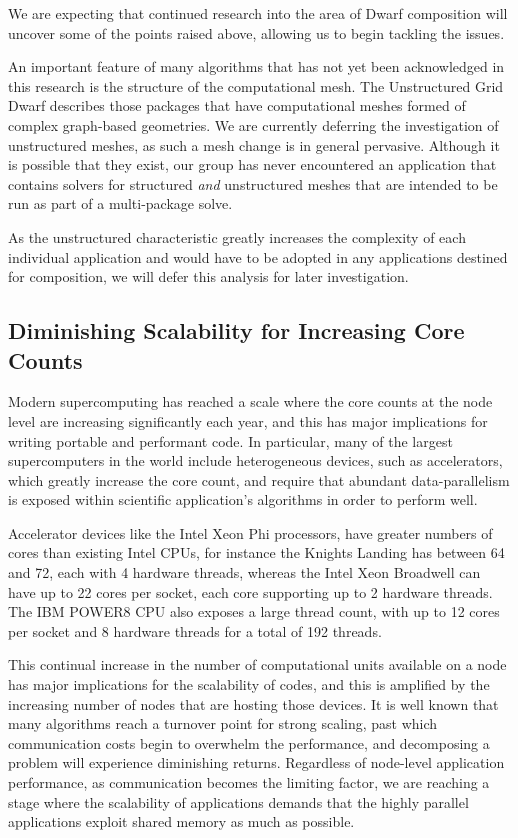 \documentclass[runningheads,a4paper]{llncs}
\begin{document}
We are expecting that continued research into the area of Dwarf composition will uncover some of the points raised above, allowing us to begin tackling the issues.

An important feature of many algorithms that has not yet been acknowledged in this research is the structure of the computational mesh. The Unstructured Grid Dwarf describes those packages that have computational meshes formed of complex graph-based geometries. We are currently deferring the investigation of unstructured meshes, as such a mesh change is in general pervasive. Although it is possible that they exist, our group has never encountered an application that contains solvers for structured \textit{and} unstructured meshes that are intended to be run as part of a multi-package solve.

As the unstructured characteristic greatly increases the complexity of each individual application and would have to be adopted in any applications destined for composition, we will defer this analysis for later investigation.

\subsection{Diminishing Scalability for Increasing Core Counts}

\label{sec:scalability-inhibit}

Modern supercomputing has reached a scale where the core counts at the node level are increasing significantly each year, and this has major implications for writing portable and performant code. In particular, many of the largest supercomputers in the world include heterogeneous devices, such as accelerators, which greatly increase the core count, and require that abundant data-parallelism is exposed within scientific application's algorithms in order to perform well.

Accelerator devices like the Intel Xeon Phi processors, have greater numbers of cores than existing Intel CPUs, for instance the Knights Landing has between 64 and 72, each with 4 hardware threads, whereas the Intel Xeon Broadwell can have up to 22 cores per socket, each core supporting up to 2 hardware threads. The IBM POWER8 CPU also exposes a large thread count, with up to 12 cores per socket and 8 hardware threads for a total of 192 threads.

This continual increase in the number of computational units available on a node has major implications for the scalability of codes, and this is amplified by the increasing number of nodes that are hosting those devices. It is well known that many algorithms reach a turnover point for strong scaling, past which communication costs begin to overwhelm the performance, and decomposing a problem will experience diminishing returns. Regardless of node-level application performance, as communication becomes the limiting factor, we are reaching a stage where the scalability of applications demands that the highly parallel applications exploit shared memory as much as possible.
\end{document}
